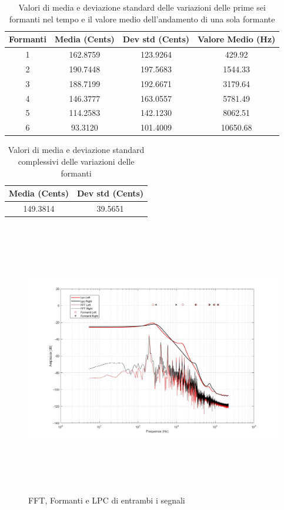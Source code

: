 \documentclass[12pt]{report}
\begin{document}
\begin{table}[htbp]
\begin{center}
\begin{tabular}{|c|c|c|c|}
\hline
Formanti & Media (Cents) & Dev std (Cents) & Valore Medio (Hz)\\
\hline
1 & 162.8759 & 123.9264 & 429.92\\
2 & 190.7448 & 197.5683 & 1544.33\\
3 & 188.7199 & 192.6671 & 3179.64\\
4 & 146.3777 & 163.0557 & 5781.49\\
5 & 114.2583 & 142.1230 & 8062.51\\
6 & 93.3120 & 101.4009 &  10650.68\\
\hline
\end{tabular}
\end{center}
\caption{Valori di media e deviazione standard delle variazioni delle prime sei formanti nel tempo e il valore medio dell'andamento di una sola formante}
\label{tab:ff}
\end{table}

\begin{table}[htbp]
\begin{center}
\begin{tabular}{|c|c|}
\hline
Media (Cents) & Dev std (Cents)\\
\hline
149.3814 & 39.5651\\
\hline
\end{tabular}
\end{center}
\caption{Valori di media e deviazione standard complessivi delle variazioni delle formanti}
\label{tab:ff_mean}
\end{table}

\begin{figure}[htbp]
\centerline{\includegraphics[height=120mm]{img/ff}}
\caption{FFT, Formanti e LPC di entrambi i segnali}
\label{fig:ff}
\end{figure}
\end{document}
